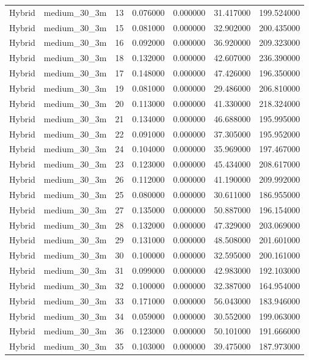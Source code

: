 \begin{tabular}{llrrrrr}
Hybrid & medium_30_3m & 13 & 0.076000 & 0.000000 & 31.417000 & 199.524000 \\
Hybrid & medium_30_3m & 15 & 0.081000 & 0.000000 & 32.902000 & 200.435000 \\
Hybrid & medium_30_3m & 16 & 0.092000 & 0.000000 & 36.920000 & 209.323000 \\
Hybrid & medium_30_3m & 18 & 0.132000 & 0.000000 & 42.607000 & 236.390000 \\
Hybrid & medium_30_3m & 17 & 0.148000 & 0.000000 & 47.426000 & 196.350000 \\
Hybrid & medium_30_3m & 19 & 0.081000 & 0.000000 & 29.486000 & 206.810000 \\
Hybrid & medium_30_3m & 20 & 0.113000 & 0.000000 & 41.330000 & 218.324000 \\
Hybrid & medium_30_3m & 21 & 0.134000 & 0.000000 & 46.688000 & 195.995000 \\
Hybrid & medium_30_3m & 22 & 0.091000 & 0.000000 & 37.305000 & 195.952000 \\
Hybrid & medium_30_3m & 24 & 0.104000 & 0.000000 & 35.969000 & 197.467000 \\
Hybrid & medium_30_3m & 23 & 0.123000 & 0.000000 & 45.434000 & 208.617000 \\
Hybrid & medium_30_3m & 26 & 0.112000 & 0.000000 & 41.190000 & 209.992000 \\
Hybrid & medium_30_3m & 25 & 0.080000 & 0.000000 & 30.611000 & 186.955000 \\
Hybrid & medium_30_3m & 27 & 0.135000 & 0.000000 & 50.887000 & 196.154000 \\
Hybrid & medium_30_3m & 28 & 0.132000 & 0.000000 & 47.329000 & 203.069000 \\
Hybrid & medium_30_3m & 29 & 0.131000 & 0.000000 & 48.508000 & 201.601000 \\
Hybrid & medium_30_3m & 30 & 0.100000 & 0.000000 & 32.595000 & 200.161000 \\
Hybrid & medium_30_3m & 31 & 0.099000 & 0.000000 & 42.983000 & 192.103000 \\
Hybrid & medium_30_3m & 32 & 0.100000 & 0.000000 & 32.387000 & 164.954000 \\
Hybrid & medium_30_3m & 33 & 0.171000 & 0.000000 & 56.043000 & 183.946000 \\
Hybrid & medium_30_3m & 34 & 0.059000 & 0.000000 & 30.552000 & 199.063000 \\
Hybrid & medium_30_3m & 36 & 0.123000 & 0.000000 & 50.101000 & 191.666000 \\
Hybrid & medium_30_3m & 35 & 0.103000 & 0.000000 & 39.475000 & 187.973000 \\

\end{tabular}

